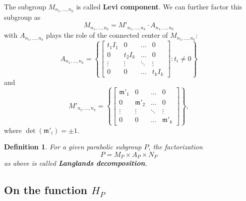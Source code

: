\documentclass[12pt]{article} %
\newtheorem{definition}{Definition}[section]
\begin{document}
The subgroup $M_{n_1,\ldots, n_k}$ is called \textbf{Levi component}. We can further factor this subgroup as
\[M_{n_1,\ldots, n_k} = M'_{n_1,\ldots, n_k} \cdot A_{n_1,\ldots, n_k}\]
with $A_{n_1,\ldots, n_k}$ plays the role of the connected center of $M_{n_1,\ldots, n_k}$:
\[A_{n_1,\ldots, n_k} = \left\lbrace \begin{bmatrix}
        t_1I_1 & 0      & \ldots & 0      \\
        0      & t_2I_k & \ldots & 0      \\
        \vdots & \vdots & \ddots & \vdots \\
        0      & 0      & \ldots & t_kI_k
    \end{bmatrix} : t_i \ne 0\right\rbrace \]
and
\[M'_{n_1,\ldots, n_k} = \left\lbrace \begin{bmatrix}
        \mathfrak{m}'_1 & 0               & \ldots & 0               \\
        0               & \mathfrak{m}'_2 & \ldots & 0               \\
        \vdots          & \vdots          & \ddots & \vdots          \\
        0               & 0               & \ldots & \mathfrak{m}'_k
    \end{bmatrix} \right\rbrace,\]
where $\det(\mathfrak{m}'_i) = \pm 1$.
\begin{definition}
    For a given parabolic subgroup $P$, the factorization
    \[P = M_P \times A_P \times N_P\]
    as above is called \textbf{Langlands decomposition}.
\end{definition}
\subsection{On the function $H_P$}
\end{document}
